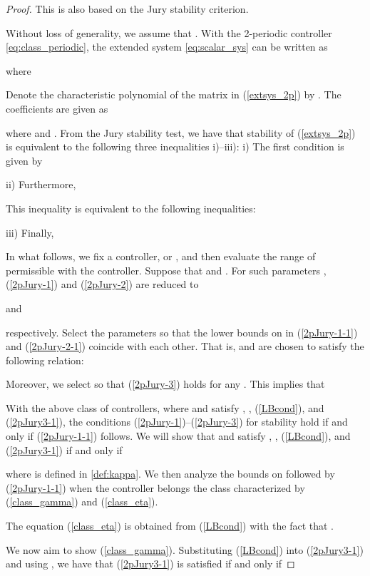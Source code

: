 \documentclass[letterpaper, 12pt, draftcls, onecolumn]{ieeeconf}
\begin{document}
\begin{proof}
This is also based on the Jury stability criterion.

Without loss of generality, we assume that .
With the 2-periodic controller \eqref{eq:class_periodic}, 
the extended system \eqref{eq:scalar_sys} can be written as

where



Denote the characteristic polynomial  of the matrix in
(\ref{extsys_2p}) by .
The coefficients  are given as

where  and .
From the Jury stability test, we have that stability of (\ref{extsys_2p}) is
equivalent to the following three inequalities i)--iii):
i) The first condition is given by


ii) Furthermore,

This inequality is equivalent to the following inequalities:


iii) Finally,



In what follows, we fix a controller, or , and then evaluate the
range of permissible  with the controller.
Suppose that  and .
For such parameters , (\ref{2pJury-1}) and (\ref{2pJury-2}) are
reduced to

and

respectively.
Select the parameters  so that the lower bounds on  in
(\ref{2pJury-1-1}) and (\ref{2pJury-2-1}) coincide with each other.
That is,  and  are chosen to satisfy the following relation:

Moreover, we select  so that (\ref{2pJury-3}) holds for any
.
This implies that

With the above class of controllers,
where  and  satisfy , , (\ref{LBcond}),
and (\ref{2pJury3-1}), the conditions (\ref{2pJury-1})--(\ref{2pJury-3}) for
stability hold if and only if
(\ref{2pJury-1-1}) follows.
We will show that  and  satisfy , , (\ref{LBcond}),
and (\ref{2pJury3-1}) if and only if

where  is defined in \eqref{def:kappa}.
We then analyze the bounds on  followed by (\ref{2pJury-1-1}) when the
controller belongs the class characterized by (\ref{class_gamma}) and
(\ref{class_eta}).

The equation (\ref{class_eta}) is obtained from (\ref{LBcond}) with
the fact that .

We now aim to show (\ref{class_gamma}).
Substituting (\ref{LBcond}) into (\ref{2pJury3-1}) and using ,
we have that (\ref{2pJury3-1}) is satisfied if and only if



\end{proof}
\end{document}
